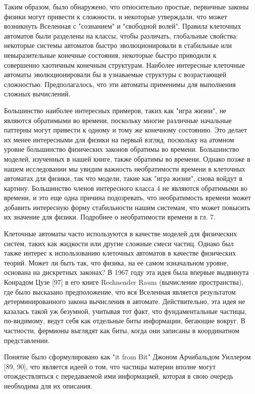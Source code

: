 \documentclass[main.tex]{subfiles}
\begin{document}
Таким образом, было обнаружено, что относительно простые, первичные законы физики могут привести к сложности, и некоторые утверждали, что может возникнуть Вселенная с "сознанием" и "свободной волей". Правила клеточных автоматов были разделены на классы, чтобы различать, глобальные свойства: некоторые системы автоматов быстро эволюционировали в стабильные или невыразительные конечные состояния, некоторые быстро приводили к совершенно хаотичным конечным структурам. Наиболее интересные клеточные автоматы эволюционировали бы в узнаваемые структуры с возрастающей сложностью. Предполагалось, что эти автоматы применимы для выполнения сложных вычислений.

Большинство наиболее интересных примеров, таких как "игра жизни", не являются обратимыми во времени, поскольку многие различные начальные паттерны могут привести к одному и тому же конечному состоянию. Это делает их менее интересными для физики на первый взгляд, поскольку на атомном уровне большинство физических законов обратимы во времени. Большинство моделей, изученных в нашей книге, также обратимы во времени. Однако позже в нашем исследовании мы увидим важность необратимости времени в клеточных автоматах для физики, так что модели, такие как "игра жизни", снова войдут в картину. Большинство членов интересного класса 4 не являются обратимыми во времени, и это еще одна причина подозревать, что необратимость времени может добавить интересную форму стабильности нашим системам, что может повысить их значение для физики. Подробнее о необратимости времени в гл. 7. 

Клеточные автоматы часто используются в качестве моделей для физических систем, таких как жидкости или другие сложные смеси частиц. Однако был также интерес к использованию клеточных автоматов в качестве физических теорий. Может ли быть так, что физика, на ее самом изначальном уровне, основана на дискретных законах? В 1967 году эта идея была впервые выдвинута Конрадом Цузе [97] в его книге Rechnender Raum (вычисление пространства), где было высказано предположение, что вся Вселенная является результатом детерминированного закона вычисления в автомате. Действительно, эта идея не казалась такой уж безумной, учитывая тот факт, что фундаментальные частицы, по-видимому, ведут себя как отдельные биты информации, бегающие вокруг. В частности, фермионы выглядят как биты, когда они записаны в координатном представлении. 

Понятие было сформулировано как "it from Bit" Джоном Арчибальдом Уиллером [89, 90], что является идеей о том, что частицы материи вполне могут отождествляться с передаваемой ими информацией, которая в свою очередь необходима для их описания. 
\end{document}
